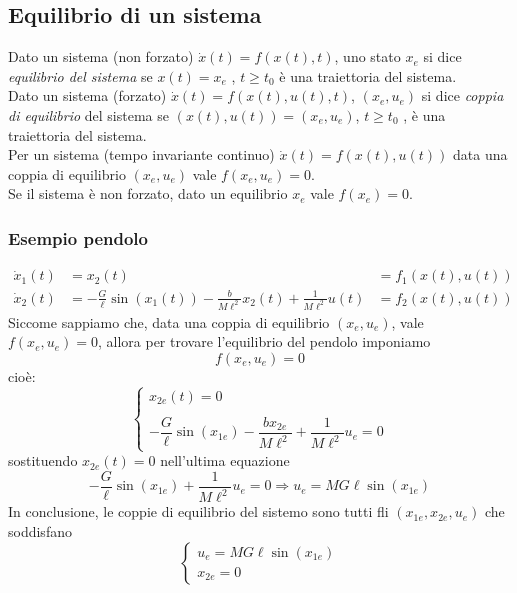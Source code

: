 \documentclass{article}
\begin{document}
\subsection{Equilibrio di un sistema}
Dato un sistema (non forzato) $\dot x(t) = f (x(t), t)$, uno stato $x_e$ si dice \textit{equilibrio del sistema} se $x(t) = x_e$ , $t\geq t_0$ è una traiettoria del sistema.
\vspace*{0.2cm}\\
Dato un sistema (forzato) $\dot x(t) = f (x(t), u(t), t)$, $(x_e , u_e )$ si dice \textit{coppia di equilibrio} del sistema se $(x(t), u(t)) = (x_e , u_e )$, $t \geq t_0$ , è una traiettoria del sistema.
\vspace*{0.2cm}\\
Per un sistema (tempo invariante continuo) $\dot x(t) = f (x(t), u(t))$ data una coppia di equilibrio $(x_e,u_e)$ vale $f(x_e,u_e)=0$.\\
Se il sistema è non forzato, dato un equilibrio $x_e$ vale $f(x_e)=0$.


\subsubsection{Esempio pendolo}
\begin{align*}
    \dot x_1(t) &= x_2(t) &= f_1(x(t),u(t))\\
    \dot x_2(t) &= - \frac{G}{\ell} \sin (x_1(t)) - \frac{b}{M \ell ^2}x_2(t) + \frac{1}{M\ell^2}u(t) &=f_2(x(t),u(t))
\end{align*}
Siccome sappiamo che, data una coppia di equilibrio $(x_e,u_e)$, vale $f(x_e,u_e)=0$, allora per trovare l'equilibrio del pendolo imponiamo 
\[
    f(x_e,u_e)=0
\]
cioè:
\[
    \begin{cases}
        x_{2e}(t) = 0\\
        \\
        - \dfrac{G}{\ell} \sin (x_{1e}) - \dfrac{b x_{2e}}{M \ell ^2} + \dfrac{1}{M\ell^2}u_e =0
    \end{cases}
\]
sostituendo $x_{2e}(t)=0$ nell'ultima equazione
\[
    - \dfrac{G}{\ell} \sin (x_{1e}) + \dfrac{1}{M\ell^2}u_e =0 \Longrightarrow u_e = M G \ell \sin(x_{1e})
\]
In conclusione, le coppie di equilibrio del sistemo sono tutti fli $(x_{1e}, x_{2e},u_e)$ che soddisfano
\[
    \begin{cases}
        u_e = M G \ell \sin(x_{1e})\\
        x_{2e}=0
    \end{cases}
\]
\end{document}
